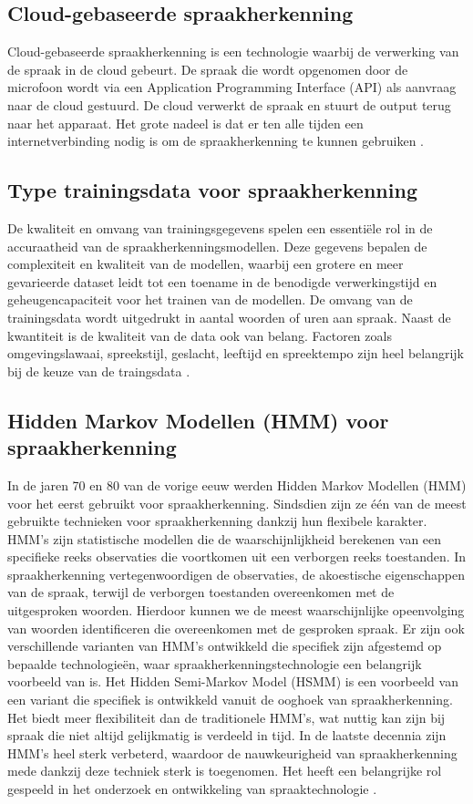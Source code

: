 \subsection{Cloud-gebaseerde spraakherkenning}
Cloud-gebaseerde spraakherkenning is een technologie waarbij de verwerking van de spraak in de cloud gebeurt. De spraak die wordt opgenomen door de microfoon wordt via een Application Programming Interface (API) als aanvraag naar de cloud gestuurd. De cloud verwerkt de spraak en stuurt de output terug naar het apparaat. Het grote nadeel is dat er ten alle tijden een internetverbinding nodig is om de spraakherkenning te kunnen gebruiken \autocite{Leitman2020}.


\subsection{Type trainingsdata voor spraakherkenning}
De kwaliteit en omvang van trainingsgegevens spelen een essentiële rol in de accuraatheid van de spraakherkenningsmodellen. Deze gegevens bepalen de complexiteit en kwaliteit van de modellen, waarbij een grotere en meer gevarieerde dataset leidt tot een toename in de benodigde verwerkingstijd en geheugencapaciteit voor het trainen van de modellen. De omvang van de trainingsdata wordt uitgedrukt in aantal woorden of uren aan spraak. Naast de kwantiteit is de kwaliteit van de data ook van belang. Factoren zoals omgevingslawaai, spreekstijl, geslacht, leeftijd en spreektempo zijn heel belangrijk bij de keuze van de traingsdata \autocite{Vimala2012}.


\subsection{Hidden Markov Modellen (HMM) voor spraakherkenning}
In de jaren 70 en 80 van de vorige eeuw werden Hidden Markov Modellen (HMM) voor het eerst gebruikt voor spraakherkenning. Sindsdien zijn ze één van de meest gebruikte technieken voor spraakherkenning dankzij hun flexibele karakter. HMM's zijn statistische modellen die de waarschijnlijkheid berekenen van een specifieke reeks observaties die voortkomen uit een verborgen reeks toestanden. In spraakherkenning vertegenwoordigen de observaties, de akoestische eigenschappen van de spraak, terwijl de verborgen toestanden overeenkomen met de uitgesproken woorden. Hierdoor kunnen we de meest waarschijnlijke opeenvolging van woorden identificeren die overeenkomen met de gesproken spraak. Er zijn ook verschillende varianten van HMM's ontwikkeld die specifiek zijn afgestemd op bepaalde technologieën, waar spraakherkenningstechnologie een belangrijk voorbeeld van is. Het Hidden Semi-Markov Model (HSMM) is een voorbeeld van een variant die specifiek is ontwikkeld vanuit de ooghoek van spraakherkenning. Het biedt meer flexibiliteit dan de traditionele HMM's, wat nuttig kan zijn bij spraak die niet altijd gelijkmatig is verdeeld in tijd. In de laatste decennia zijn HMM's heel sterk verbeterd, waardoor de nauwkeurigheid van spraakherkenning mede dankzij deze techniek sterk is toegenomen. Het heeft een belangrijke rol gespeeld in het onderzoek en ontwikkeling van spraaktechnologie \autocite{Mor2020}.

